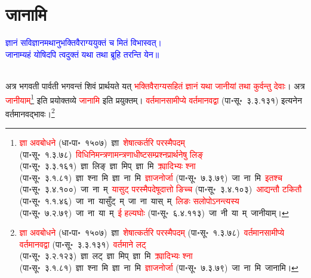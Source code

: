 \section[जानामि]{जानामि}
\centering\textcolor{blue}{ज्ञानं सविज्ञानमथानुभक्तिवैराग्ययुक्तं च मितं विभास्वत्।\nopagebreak\\
जानाम्यहं योषिदपि त्वदुक्तं यथा तथा ब्रूहि तरन्ति येन॥}\nopagebreak\\
\\
\fontsize{14}{21}\selectfont\begin{sloppypar}\justifying\noindent\hspace{10mm} अत्र भगवती पार्वती भगवन्तं शिवं प्रार्थयते यत् \textcolor{red}{भक्ति\-वैराग्य\-सहितं ज्ञानं यथा जानीयां तथा कुर्वन्तु देवाः}। अत्र \textcolor{red}{जानीयाम्}\footnote{\textcolor{red}{ज्ञा अवबोधने} (धा॰पा॰~१५०७)~\arrow ज्ञा~\arrow \textcolor{red}{शेषात्कर्तरि परस्मैपदम्} (पा॰सू॰~१.३.७८)~\arrow \textcolor{red}{विधि\-निमन्‍त्रणामन्‍त्रणाधीष्‍ट\-सम्प्रश्‍न\-प्रार्थनेषु लिङ्} (पा॰सू॰~३.३.१६१)~\arrow ज्ञा~लिङ्~\arrow ज्ञा~मिप्~\arrow ज्ञा~मि~\arrow \textcolor{red}{क्र्यादिभ्यः श्ना} (पा॰सू॰~३.१.८१)~\arrow ज्ञा~श्ना~मि~\arrow ज्ञा~ना~मि~\arrow \textcolor{red}{ज्ञाजनोर्जा} (पा॰सू॰~७.३.७९)~\arrow जा~ना~मि~\arrow \textcolor{red}{इतश्च} (पा॰सू॰~३.४.१००)~\arrow जा~ना~म्~\arrow \textcolor{red}{यासुट् परस्मैपदेषूदात्तो ङिच्च} (पा॰सू॰~३.४.१०३)~\arrow \textcolor{red}{आद्यन्तौ टकितौ} (पा॰सू॰~१.१.४६)~\arrow जा~ना~यासुँट्~म्~\arrow जा~ना~यास्~म्~\arrow \textcolor{red}{लिङः सलोपोऽनन्त्यस्य} (पा॰सू॰~७.२.७९)~\arrow जा~ना~या~म्~\arrow \textcolor{red}{ई हल्यघोः} (पा॰सू॰~६.४.११३)~\arrow जा~नी~या~म्~\arrow जानीयाम्।} इति प्रयोक्तव्ये \textcolor{red}{जानामि} इति प्रयुक्तम्। \textcolor{red}{वर्तमान\-सामीप्ये वर्तमानवद्वा} (पा॰सू॰~३.३.१३१) इत्यनेन वर्तमानवद्भावः।\footnote{\textcolor{red}{ज्ञा अवबोधने} (धा॰पा॰~१५०७)~\arrow ज्ञा~\arrow \textcolor{red}{शेषात्कर्तरि परस्मैपदम्} (पा॰सू॰~१.३.७८)~\arrow \textcolor{red}{वर्तमान\-सामीप्ये वर्तमानवद्वा} (पा॰सू॰~३.३.१३१)~\arrow \textcolor{red}{वर्तमाने लट्} (पा॰सू॰~३.२.१२३)~\arrow ज्ञा~लट्~\arrow ज्ञा~मिप्~\arrow ज्ञा~मि~\arrow \textcolor{red}{क्र्यादिभ्यः श्ना} (पा॰सू॰~३.१.८१)~\arrow ज्ञा~श्ना~मि~\arrow ज्ञा~ना~मि~\arrow \textcolor{red}{ज्ञाजनोर्जा} (पा॰सू॰~७.३.७९)~\arrow जा~ना~मि~\arrow जानामि।}\end{sloppypar}

